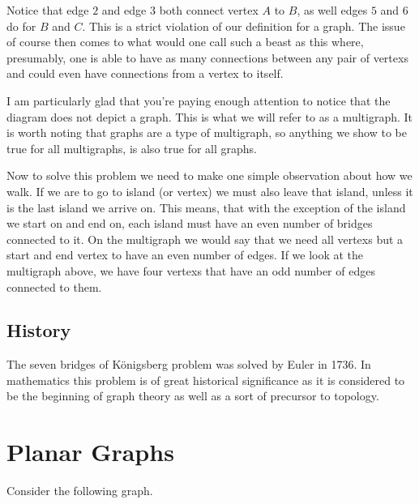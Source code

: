 \documentclass{article}
\begin{document}
Notice that \gls{edge} $2$ and \gls{edge} $3$ both connect \gls{vertex} $A$ to $B$, as well \glspl{edge} $5$ and $6$ do for $B$ and $C$. This is a strict violation of our definition for a graph. The issue of course then comes to what would one call such a beast as this where, presumably, one is able to have as many connections between any pair of \glspl{vertex} and could even have connections from a \gls{vertex} to itself.

I am particularly glad that you're paying enough attention to notice that the diagram does not depict a graph. This is what we will refer to as a \gls{multigraph}. It is worth noting that graphs are a type of \gls{multigraph}, so anything we show to be true for all \glspl{multigraph}, is also true for all graphs.

Now to solve this problem we need to make one simple observation about how we walk. If we are to go to island (or vertex) we must also leave that island, unless it is the last island we arrive on. This means, that with the exception of the island we start on and end on, each island must have an even number of bridges connected to it. On the \gls{multigraph} we would say that we need all \glspl{vertex} but a start and end \gls{vertex} to have an even number of edges. If we look at the \gls{multigraph} above, we have four \glspl{vertex} that have an odd number of \glspl{edge} connected to them.

\subsection{History}
The seven bridges of K\"onigsberg problem was solved by Euler %
in 1736. In mathematics this problem is of great historical significance as it is considered to be the beginning of graph theory as well as a sort of precursor to topology. %

\section{Planar Graphs}

Consider the following graph.

\begin{center}
\end{center}
\end{document}
